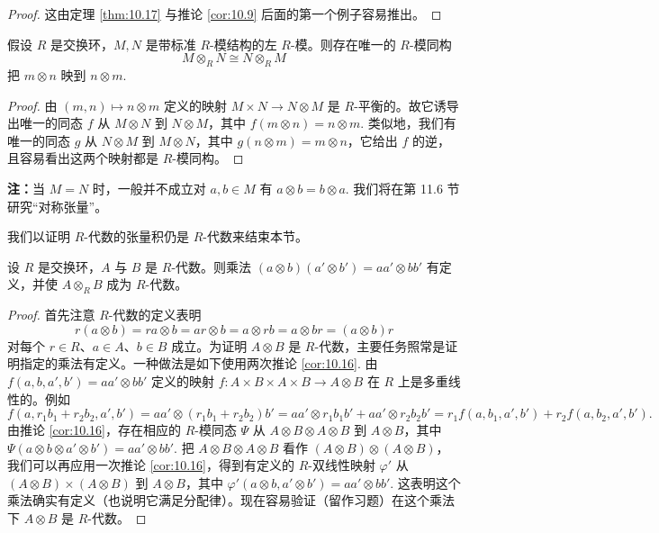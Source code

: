 \begin{proof}
这由定理 \ref{thm:10.17} 与推论 \ref{cor:10.9} 后面的第一个例子容易推出。
\end{proof}

\begin{proposition}\label{pro:10.20}
假设 \(R\) 是交换环，\(M, N\) 是带标准 \(R\)-模结构的左 \(R\)-模。则存在唯一的 \(R\)-模同构
\[
M \otimes_R N \cong N \otimes_R M
\]
把 \(m \otimes n\) 映到 \(n \otimes m\).
\end{proposition}

\begin{proof}
由 \((m, n) \mapsto n \otimes m\) 定义的映射 \(M \times N \to N \otimes M\) 是 \(R\)-平衡的。故它诱导出唯一的同态 \(f\) 从 \(M \otimes N\) 到 \(N \otimes M\)，其中 \(f(m \otimes n) = n \otimes m\). 类似地，我们有唯一的同态 \(g\) 从 \(N \otimes M\) 到 \(M \otimes N\)，其中 \(g(n \otimes m) = m \otimes n\)，它给出 \(f\) 的逆，且容易看出这两个映射都是 \(R\)-模同构。
\end{proof}

\noindent\textbf{注：}当 \(M = N\) 时，一般并不成立对 \(a, b \in M\) 有 \(a \otimes b = b \otimes a\). 我们将在第 11.6 节研究“对称张量”。

我们以证明 \(R\)-代数的张量积仍是 \(R\)-代数来结束本节。

\begin{proposition}\label{pro:10.21}
设 \(R\) 是交换环，\(A\) 与 \(B\) 是 \(R\)-代数。则乘法 \((a \otimes b)(a' \otimes b') = aa' \otimes bb'\) 有定义，并使 \(A \otimes_R B\) 成为 \(R\)-代数。
\end{proposition}

\begin{proof}
首先注意 \(R\)-代数的定义表明
\[
r(a \otimes b) = ra \otimes b = ar \otimes b = a \otimes rb = a \otimes br = (a \otimes b)r
\]
对每个 \(r \in R\)、\(a \in A\)、\(b \in B\) 成立。为证明 \(A \otimes B\) 是 \(R\)-代数，主要任务照常是证明指定的乘法有定义。一种做法是如下使用两次推论 \ref{cor:10.16}. 由 \(f(a, b, a', b') = aa' \otimes bb'\) 定义的映射 \(f : A \times B \times A \times B \to A \otimes B\) 在 \(R\) 上是多重线性的。例如
\[
f(a, r_1b_1+r_2b_2, a', b') = aa' \otimes (r_1b_1+r_2b_2)b' = aa' \otimes r_1b_1b'+aa' \otimes r_2b_2b' = r_1f(a, b_1, a', b')+r_2f(a, b_2, a', b').
\]
由推论 \ref{cor:10.16}，存在相应的 \(R\)-模同态 \(\Psi\) 从 \(A \otimes B \otimes A \otimes B\) 到 \(A \otimes B\)，其中 \(\Psi(a \otimes b \otimes a' \otimes b') = aa' \otimes bb'\). 把 \(A \otimes B \otimes A \otimes B\) 看作 \((A \otimes B) \otimes (A \otimes B)\)，我们可以再应用一次推论 \ref{cor:10.16}，得到有定义的 \(R\)-双线性映射 \(\varphi'\) 从 \((A \otimes B) \times (A \otimes B)\) 到 \(A \otimes B\)，其中 \(\varphi'(a \otimes b, a' \otimes b') = aa' \otimes bb'\). 这表明这个乘法确实有定义（也说明它满足分配律）。现在容易验证（留作习题）在这个乘法下 \(A \otimes B\) 是 \(R\)-代数。
\end{proof}

